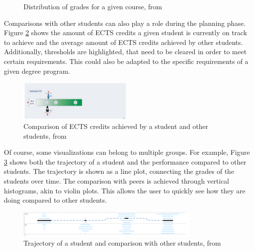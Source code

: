 \begin{figure}
\begin{minipage}[b]{0.4\textwidth}
        \caption{Distribution of grades for a given course, from \cite{Dashboard-StudentProgress}}
        \label{fig:comparison_course.png}
    \end{minipage}


\end{figure}

Comparisons with other students can also play a role during the planning phase. Figure \ref{fig:comparison_ects.png} shows the amount of ECTS credits a given student is currently on track to achieve and the average amount of ECTS credits achieved by other students.
Additionally, thresholds are highlighted, that need to be cleared in order to meet certain requirements. This could also be adapted to the specific requirements of a given degree program.

\begin{figure}
    \centering
    \includegraphics[width=0.5\textwidth]{figures/comp_ects.png}
    \caption{Comparison of ECTS credits achieved by a student and other students, from \cite{Dashboard-StudentProgress}}
    \label{fig:comparison_ects.png}
\end{figure}

Of course, some visualizations can belong to multiple groups. For example, Figure \ref{fig:comparison_trend} shows both the trajectory of a student and the performance compared to other students. The trajectory is shown as a line plot, connecting the grades of the students over time. The comparison with peers is achieved through vertical histograms, akin to violin plots. This allows the user to quickly see how they are doing compared to other students.

\begin{figure}
    \centering
    \includegraphics[width=0.8\textwidth]{figures/comp_trend.png}
    \caption{Trajectory of a student and comparison with other students, from \cite{LISSA}}
    \label{fig:comparison_trend}
\end{figure}

